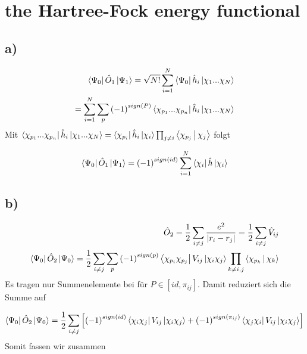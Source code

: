 \section{the Hartree-Fock energy functional}

\subsection{a)}

\begin{align}
\Bra{\Psi_0} \hat{O}_1 \Ket{\Psi_1} = \sqrt{N!} \sum_{i=1}^N \Bra{\Psi_0} \hat{h}_i \Ket{\chi_1 ... \chi_N} \\
= \sum_{i=1}^N \sum_p \left( -1 \right)^{sign \left( P \right)} \Bra{\chi_{p_1} ... \chi_{p_n}} \hat{h}_i \Ket{\chi_1 ... \chi_N}
\end{align}
Mit $\Bra{\chi_{p_1} ... \chi_{p_n}} \hat{h}_i \Ket{\chi_1 ... \chi_N} = \Bra{\chi_{p_i}} \hat{h}_i  \Ket{\chi_i} \prod_{j \neq i} \Braket{ \chi_{p_j} | \chi_j}$ folgt

\begin{align}
\Bra{\Psi_0} \hat{O}_1 \Ket{\Psi_1} = \left(-1 \right)^{sign \left( id \right)} \sum_{i=1}^N \Bra{\chi_i} \hat{h} \Ket{\chi_i}
\end{align}

\subsection{b)}

\begin{align}
\hat{O}_2 = \frac{1}{2} \sum_{i \neq j} \frac{e^2}{|r_i - r_j|} = \frac{1}{2} \sum_{i \neq j} \hat{V}_{ij} \\
\Bra{\Psi_0} \hat{O}_2 \Ket{\Psi_0} = \frac{1}{2} \sum_{i \neq j} \sum_p  \left(-1 \right)^{sign \left( p \right)} \Bra{\chi_{p_i} \chi_{p_j}} V_{ij} \Ket{\chi_i \chi_j} \prod_{k \neq i,j} \Braket{\chi_{p_k} | \chi_k}
\end{align}
Es tragen nur Summenelemente bei f\"ur $P \in \left[ id, \pi_{ij} \right]$. Damit reduziert sich die Summe auf

\begin{align}
\Bra{\Psi_0} \hat{O}_2 \Ket{\Psi_0} = \frac{1}{2} \sum_{i \neq j} \left[  \left(-1 \right)^{sign \left( id \right)} \Bra{\chi_i \chi_j} V_{ij} \Ket{\chi_i \chi_j} + \left(-1 \right)^{sign \left( \pi_{ij} \right)} \Bra{\chi_j \chi_i} V_{ij} \Ket{\chi_i \chi_j} \right]
\end{align}
Somit fassen wir zusammen

